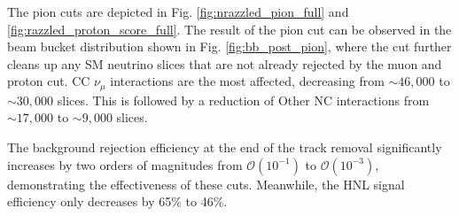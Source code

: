 The pion cuts are depicted in Fig. \ref{fig:nrazzled_pion_full} and \ref{fig:razzled_proton_score_full}. 
The result of the pion cut can be observed in the beam bucket distribution shown in Fig. \ref{fig:bb_post_pion}, where the cut further cleans up any SM neutrino slices that are not already rejected by the muon and proton cut.  
CC $\nu_\mu$ interactions are the most affected, decreasing from $\sim46,000$ to $\sim30,000$ slices.
This is followed by a reduction of Other NC interactions from $\sim17,000$ to $\sim9,000$ slices.

The background rejection efficiency at the end of the track removal significantly increases by two orders of magnitudes from $\mathcal{O}(10^{-1})$ to $\mathcal{O}(10^{-3})$, demonstrating the effectiveness of these cuts.
Meanwhile, the HNL signal efficiency only decreases by 65\% to 46\%.

